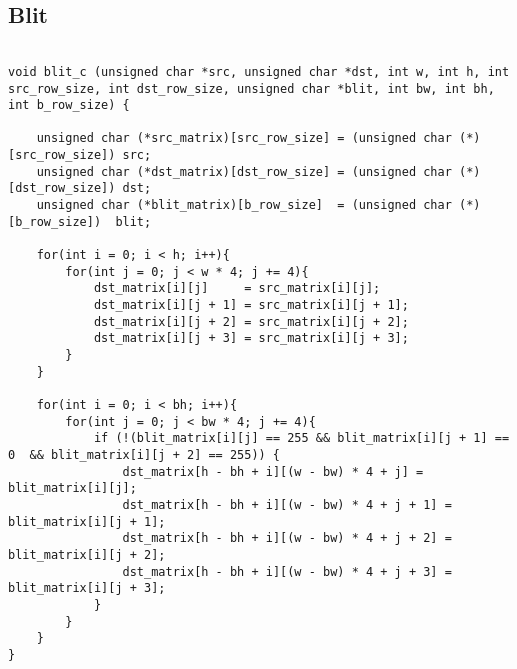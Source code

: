 \subsection{Blit}

\begin{codesnippet}
\begin{verbatim}

void blit_c (unsigned char *src, unsigned char *dst, int w, int h, int src_row_size, int dst_row_size, unsigned char *blit, int bw, int bh, int b_row_size) {

    unsigned char (*src_matrix)[src_row_size] = (unsigned char (*)[src_row_size]) src;
    unsigned char (*dst_matrix)[dst_row_size] = (unsigned char (*)[dst_row_size]) dst;
    unsigned char (*blit_matrix)[b_row_size]  = (unsigned char (*)[b_row_size])  blit;

    for(int i = 0; i < h; i++){
        for(int j = 0; j < w * 4; j += 4){
            dst_matrix[i][j]     = src_matrix[i][j];
            dst_matrix[i][j + 1] = src_matrix[i][j + 1];
            dst_matrix[i][j + 2] = src_matrix[i][j + 2];
            dst_matrix[i][j + 3] = src_matrix[i][j + 3];
        }
    }

    for(int i = 0; i < bh; i++){
        for(int j = 0; j < bw * 4; j += 4){
            if (!(blit_matrix[i][j] == 255 && blit_matrix[i][j + 1] == 0  && blit_matrix[i][j + 2] == 255)) {
                dst_matrix[h - bh + i][(w - bw) * 4 + j] =     blit_matrix[i][j];
                dst_matrix[h - bh + i][(w - bw) * 4 + j + 1] = blit_matrix[i][j + 1];
                dst_matrix[h - bh + i][(w - bw) * 4 + j + 2] = blit_matrix[i][j + 2];
                dst_matrix[h - bh + i][(w - bw) * 4 + j + 3] = blit_matrix[i][j + 3];
            }
        }
    }
}
\end{verbatim}
\end{codesnippet}
